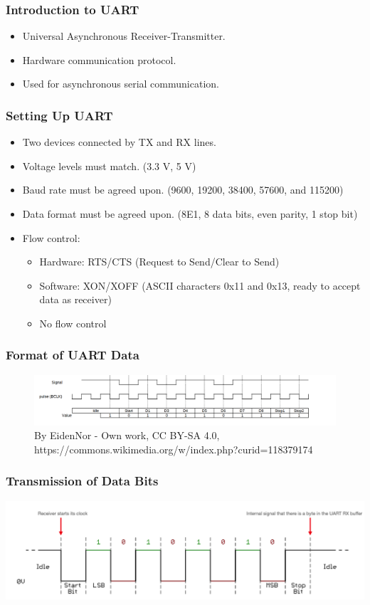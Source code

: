 
\begin{frame}
    \frametitle{Introduction to UART}
    \begin{itemize}
        \item Universal Asynchronous Receiver-Transmitter.
        \item Hardware communication protocol.
        \item Used for asynchronous serial communication.
    \end{itemize}
\end{frame}

\begin{frame}
    \frametitle{Setting Up UART}
    \begin{itemize}
        \item Two devices connected by TX and RX lines.
        \item Voltage levels must match. (3.3 V, 5 V)
        \item Baud rate must be agreed upon. (9600, 19200, 38400, 57600, and 115200)
        \item Data format must be agreed upon. (8E1, 8 data bits, even parity, 1 stop bit)
        \item Flow control:
        \begin{itemize}
            \item Hardware: RTS/CTS (Request to Send/Clear to Send)
            \item Software: XON/XOFF (ASCII characters 0x11 and 0x13, ready to accept data as receiver)
            \item No flow control
        \end{itemize}
    \end{itemize}
\end{frame}

\begin{frame}
    \frametitle{Format of UART Data}
    \begin{figure}
        \includegraphics[width=0.9\linewidth]{media/UART.png}
        \caption{By EidenNor - Own work, CC BY-SA 4.0, https://commons.wikimedia.org/w/index.php?curid=118379174}
    \end{figure}
\end{frame}

\begin{frame}
    \frametitle{Transmission of Data Bits}
    \includegraphics[width=0.8\linewidth]{media/uart_timing.png}
\end{frame}


